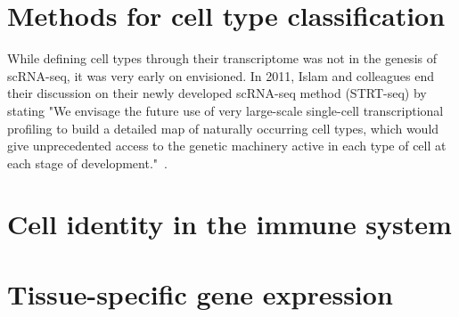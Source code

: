 





\section{Methods for cell type classification}  %
\label{section1.3}

While defining cell types through their transcriptome was not in the genesis of scRNA-seq, it was very early on envisioned. In 2011, Islam and colleagues end their discussion on their newly developed scRNA-seq method (STRT-seq) by stating "We envisage the future use of very large-scale single-cell transcriptional profiling to build a detailed map of naturally occurring cell types, which would give unprecedented access to the genetic machinery active in each type of cell at each stage of development."~\citep{islam_characterization_2011}. 





\section{Cell identity in the immune system}  %
\label{section1.4}









\section{Tissue-specific gene expression}  %
\label{section1.5}


